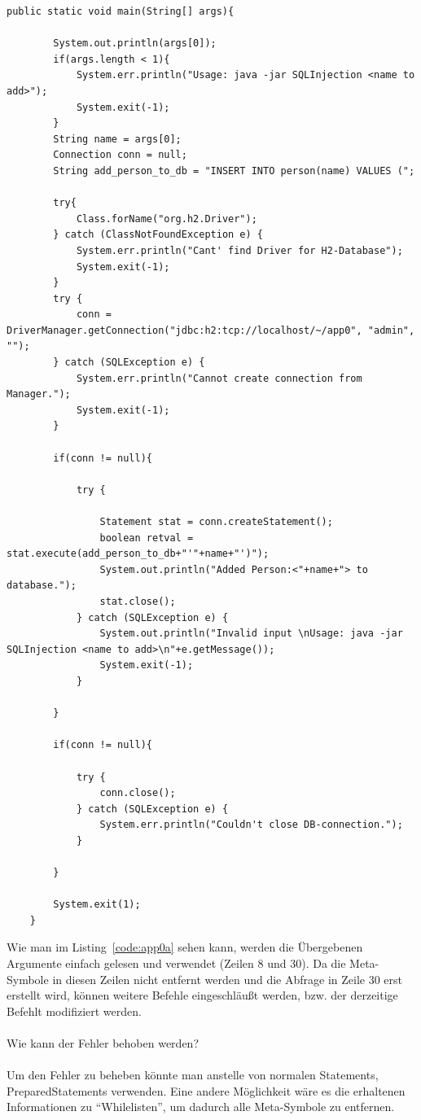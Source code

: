 \documentclass[12pt,a4paper,titlepage,oneside]{scrartcl}
\begin{document}
\begin{lstlisting}[caption=Code mit Schwachstelle,label=code:app0a,style=c]
public static void main(String[] args){

		System.out.println(args[0]);
        if(args.length < 1){
            System.err.println("Usage: java -jar SQLInjection <name to add>");
            System.exit(-1);
        }
        String name = args[0];
        Connection conn = null;
        String add_person_to_db = "INSERT INTO person(name) VALUES (";

        try{
            Class.forName("org.h2.Driver");
        } catch (ClassNotFoundException e) {
            System.err.println("Cant' find Driver for H2-Database");
            System.exit(-1);
        }
        try {
            conn = DriverManager.getConnection("jdbc:h2:tcp://localhost/~/app0", "admin", "");
        } catch (SQLException e) {
            System.err.println("Cannot create connection from Manager.");
            System.exit(-1);
        }

        if(conn != null){

            try {

                Statement stat = conn.createStatement();
                boolean retval = stat.execute(add_person_to_db+"'"+name+"')");
                System.out.println("Added Person:<"+name+"> to database.");
                stat.close();
            } catch (SQLException e) {
                System.out.println("Invalid input \nUsage: java -jar SQLInjection <name to add>\n"+e.getMessage());
                System.exit(-1);
            }

        }

        if(conn != null){

            try {
                conn.close();
            } catch (SQLException e) {
                System.err.println("Couldn't close DB-connection.");
            }

        }

        System.exit(1);
    }
\end{lstlisting}

Wie man im Listing~\ref*{code:app0a} sehen kann, werden die Übergebenen Argumente einfach gelesen und verwendet (Zeilen 8 und 30). Da die Meta-Symbole in diesen Zeilen nicht entfernt werden und die Abfrage in Zeile 30 erst erstellt wird, können weitere Befehle eingeschläußt werden, bzw. der derzeitige Befehlt modifiziert werden. \\
\\
Wie kann der Fehler behoben werden? \\
\\
Um den Fehler zu beheben könnte man anstelle von normalen Statements, PreparedStatements verwenden. Eine andere Möglichkeit wäre es die erhaltenen Informationen zu "`Whilelisten"', um dadurch alle Meta-Symbole zu entfernen.
\end{document}
